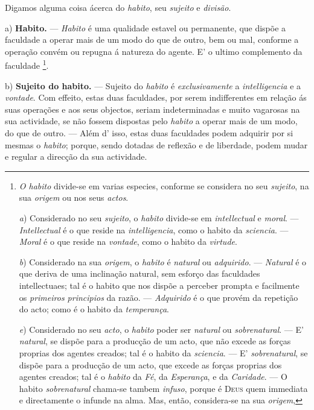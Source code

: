 Digamos alguma coisa ácerca do \emph{habito}, seu \emph{sujeito} e \emph{divisão}.

a) \textbf{Habito.} --- \emph{Habito} é uma qualidade estavel ou permanente, que dispõe a faculdade a operar mais de um modo do que de outro, bem ou mal, conforme a operação convém ou repugna á natureza do agente. E' o ultimo complemento da faculdade \footnote{\emph{O habito} divide-se em varias especies, conforme se considera no seu \emph{sujeito}, na sua \emph{origem} ou nos seus \emph{actos}.\par \emph{a}) Considerado no seu \emph{sujeito}, o \emph{habito} divide-se em \emph{intellectual} e \emph{moral}. --- \emph{Intellectual} é o que reside na \emph{intelligencia}, como o habito da \emph{sciencia}. --- \emph{Moral} é o que reside na \emph{vontade}, como o habito da \emph{virtude}.\par \emph{b}) Considerado na sua \emph{origem}, o \emph{habito} é \emph{natural} ou \emph{adquirido}. --- \emph{Natural} é o que deriva de uma inclinação natural, sem esforço das faculdades intellectuaes; tal é o habito que nos dispõe a perceber prompta e facilmente os \emph{primeiros principios} da razão. --- \emph{Adquirido} é o que provém da repetição do acto; como é o habito da \emph{temperança}.\par \emph{e}) Considerado no seu \emph{acto}, o \emph{habito} poder ser \emph{natural} ou \emph{sobrenatural}. --- E' \emph{natural}, se dispõe para a producção de um acto, que não excede as forças proprias dos agentes creados; tal é o habito da \emph{sciencia}. --- E' \emph{sobrenatural}, se dispõe para a producção de um acto, que excede as forças proprias dos agentes creados; tal é o \emph{habito} da \emph{Fé}, da \emph{Esperança}, e da \emph{Caridade}. --- O habito \emph{sobrenatural} chama-se tambem \emph{infuso}, porque é \textsc{Deus} quem immediata e directamente o infunde na alma. Mas, então, considera-se na sua \emph{origem},}.

b) \textbf{Sujeito do habito.} --- Sujeito do \emph{habito} é \emph{exclusivamente} a \emph{intelligencia} e a \emph{vontade}. Com effeito, estas duas faculdades, por serem indifferentes em relação ás suas operações e aos seus objectos, seriam indeterminadas e muito vagarosas na sua actividade, se não fossem dispostas pelo \emph{habito} a operar mais de um modo, do que de outro. --- Além d' isso, estas duas faculdades podem adquirir por si mesmas o \emph{habito}; porque, sendo dotadas de reflexão e de liberdade, podem mudar e regular a direcção da sua actividade.

